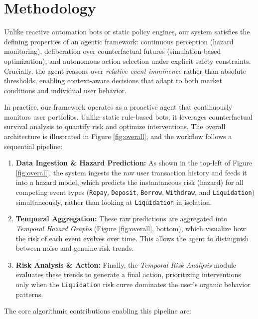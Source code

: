 \documentclass[manuscript,screen,review]{acmart}
\begin{document}
\section{Methodology}
\label{sec:methodology}

Unlike reactive automation bots or static policy engines, our system satisfies the defining properties of an agentic framework: continuous perception (hazard monitoring), deliberation over counterfactual futures (simulation-based optimization), and autonomous action selection under explicit safety constraints. Crucially, the agent reasons over \emph{relative event imminence} rather than absolute thresholds, enabling context-aware decisions that adapt to both market conditions and individual user behavior.

In practice, our framework operates as a proactive agent that continuously monitors user portfolios. Unlike static rule-based bots, it leverages counterfactual survival analysis to quantify risk and optimize interventions. The overall architecture is illustrated in Figure \ref{fig:overall}, and the workflow follows a sequential pipeline:

\begin{enumerate}
    \item \textbf{Data Ingestion \& Hazard Prediction:} As shown in the top-left of Figure \ref{fig:overall}, the system ingests the raw user transaction history and feeds it into a hazard model, which predicts the instantaneous risk (hazard) for all competing event types (\texttt{Repay}, \texttt{Deposit}, \texttt{Borrow}, \texttt{Withdraw}, and \texttt{Liquidation}) simultaneously, rather than looking at \texttt{Liquidation} in isolation.
    \item \textbf{Temporal Aggregation:} These raw predictions are aggregated into \emph{Temporal Hazard Graphs} (Figure \ref{fig:overall}, bottom), which visualize how the risk of each event evolves over time. This allows the agent to distinguish between noise and genuine risk trends.
    \item \textbf{Risk Analysis \& Action:} Finally, the \emph{Temporal Risk Analysis} module evaluates these trends to generate a final action, prioritizing interventions only when the \texttt{Liquidation} risk curve dominates the user's organic behavior patterns.
\end{enumerate}

\noindent The core algorithmic contributions enabling this pipeline are: 
\end{document}
